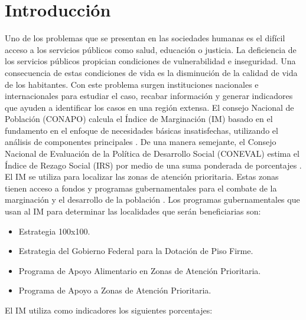 \section{Introducción}

Uno de los problemas que se presentan en las sociedades humanas es el difícil acceso a los servicios públicos como salud, educación o justicia. La deficiencia de los servicios públicos propician condiciones de vulnerabilidad e inseguridad. Una consecuencia de estas condiciones de vida es la disminución de la calidad de vida de los habitantes. Con este problema surgen instituciones nacionales e internacionales para estudiar el caso, recabar información y generar indicadores que ayuden a identificar los casos en una región extensa. El consejo Nacional de Población (CONAPO) calcula el Índice de Marginación (IM) basado en el fundamento en el enfoque de necesidades básicas insatisfechas, utilizando el análisis de componentes principales \cite{conapo_2021}. De una manera semejante, el Consejo Nacional de Evaluación de la Política de Desarrollo Social (CONEVAL) estima el Índice de Rezago Social (IRS) por medio de una suma ponderada de porcentajes \cite{CONEVAL_2007}.  El IM se utiliza para localizar las zonas de atención prioritaria. Estas zonas tienen acceso a fondos y programas gubernamentales para el combate de la marginación y el desarrollo de la población \cite{DOF_2011,DOF_2012,DOF_2013,DOF_2014,DOF_2015,DOF_2016,DOF_2017,DOF_2018,DOF_2019}. Los programas gubernamentales que usan al IM para determinar las localidades que serán beneficiarias son:

\begin{itemize}
    \item Estrategia 100x100\cite{CONEVAL_2013}.
    \item Estrategia del Gobierno Federal para la Dotación de Piso Firme\cite{DOF_2020}.
    \item Programa de Apoyo Alimentario en Zonas de Atención Prioritaria\cite{SEDESOL_2008}.
    \item Programa de Apoyo a Zonas de Atención Prioritaria\cite{DOF_2014_zonas}.
\end{itemize}


El IM utiliza como indicadores\cite{CONAPO_2022} los siguientes porcentajes:

